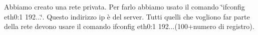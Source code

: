 Abbiamo creato una rete privata. Per farlo abbiamo usato il comando \char`\"{}ifconfig eth0\+:1 192...\char`\"{}. Questo indirizzo ip è del server. Tutti quelli che vogliono far parte della rete devono usare il comando \textquotesingle{}ifconfig eth0\+:1 192...(100+numero di registro)\textquotesingle{}. 